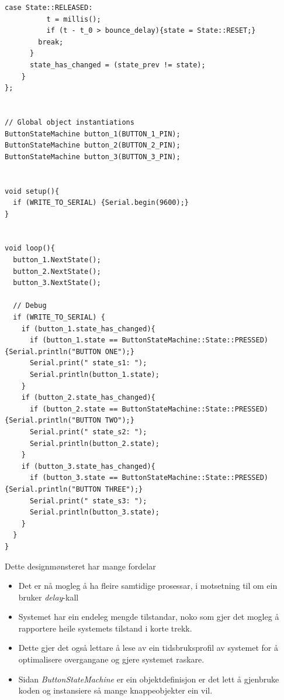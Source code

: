 \documentclass[12pt,a4paper]{article}
\begin{document}
\begin{lstlisting}[language=Arduino, basicstyle=\tiny]
        case State::RELEASED:
          t = millis();
          if (t - t_0 > bounce_delay){state = State::RESET;}
        break;
      }
      state_has_changed = (state_prev != state);
    }
};


// Global object instantiations
ButtonStateMachine button_1(BUTTON_1_PIN);
ButtonStateMachine button_2(BUTTON_2_PIN);
ButtonStateMachine button_3(BUTTON_3_PIN);


void setup(){
  if (WRITE_TO_SERIAL) {Serial.begin(9600);}
}


void loop(){
  button_1.NextState();
  button_2.NextState();
  button_3.NextState();

  // Debug
  if (WRITE_TO_SERIAL) {
    if (button_1.state_has_changed){
      if (button_1.state == ButtonStateMachine::State::PRESSED) {Serial.println("BUTTON ONE");}
      Serial.print(" state_s1: ");
      Serial.println(button_1.state);
    }
    if (button_2.state_has_changed){
      if (button_2.state == ButtonStateMachine::State::PRESSED) {Serial.println("BUTTON TWO");}
      Serial.print(" state_s2: ");
      Serial.println(button_2.state);
    }
    if (button_3.state_has_changed){
      if (button_3.state == ButtonStateMachine::State::PRESSED) {Serial.println("BUTTON THREE");}
      Serial.print(" state_s3: ");
      Serial.println(button_3.state);
    }
  }
}
    \end{lstlisting}

    Dette designmønsteret har mange fordelar
    \begin{itemize}
      \item Det er nå mogleg å ha fleire samtidige prosessar, i motsetning til om ein bruker
        \textit{delay}-kall
      \item Systemet har ein endeleg mengde tilstandar, noko som gjer det mogleg å rapportere
        heile systemets tilstand i korte trekk.
      \item Dette gjer det også lettare å lese av ein tidsbruksprofil av systemet for å 
        optimalisere overgangane og gjere systemet raskare.
      \item Sidan \textit{ButtonStateMachine} er ein objektdefinisjon er det lett å gjenbruke
        koden og instansiere så mange knappeobjekter ein vil.
    \end{itemize}
\end{document}
